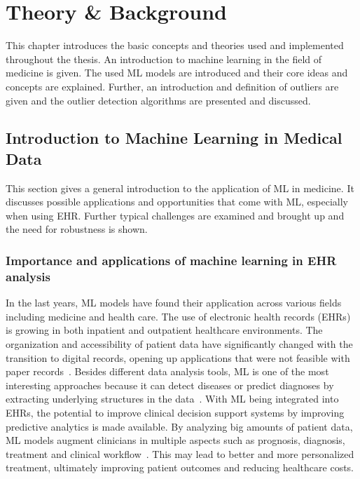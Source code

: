 \chapter{Theory \& Background}
\label{ch:basics}
This chapter introduces the basic concepts and theories used and implemented throughout the thesis. An introduction to machine learning in the field of medicine is given. The used ML models are introduced and their core ideas and concepts are explained. Further, an introduction and definition of outliers are given and the outlier detection algorithms are presented and discussed.

\section{Introduction to Machine Learning in Medical Data}
\label{se:Intro ML in Medicine}
This section gives a general introduction to the application of ML in medicine. It discusses possible applications and opportunities that come with ML, especially when using EHR. Further typical challenges are examined and brought up and the need for robustness is shown. 

\subsection{Importance and applications of machine learning in EHR analysis}


In the last years, ML models have found their application across various fields including medicine and health care. The use of electronic health records (EHRs) is growing in both inpatient and outpatient healthcare environments. The organization and accessibility of patient data have significantly changed with the transition to digital records, opening up applications that were not feasible with paper records~\cite{wu_prediction_2010}. Besides different data analysis tools, ML is one of the most interesting approaches because it can detect diseases or predict diagnoses by extracting underlying structures in the data~\cite{garg_role_2021}.\newline\newline
With ML being integrated into EHRs, the potential to improve clinical decision support systems by improving predictive analytics is made available. By analyzing big amounts of patient data, ML models augment clinicians in multiple aspects such as prognosis, diagnosis, treatment and clinical workflow~\cite{rajkomar_alvin_machine_2019}. This may lead to better and more personalized treatment, ultimately improving patient outcomes and reducing healthcare costs. 



